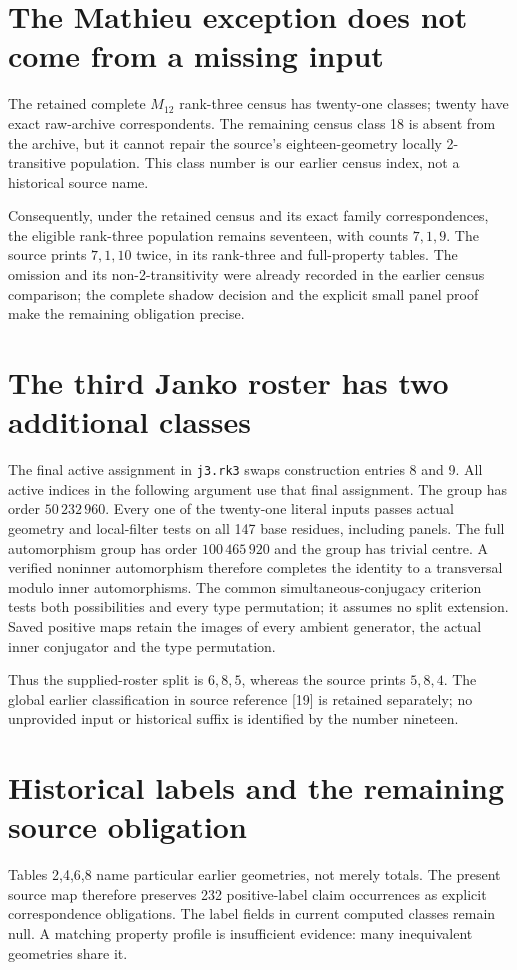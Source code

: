 \documentclass[11pt,a4paper]{article}
\begin{document}
\section{The Mathieu exception does not come from a missing input}
The retained complete $M_{12}$ rank-three census has twenty-one classes;
twenty have exact raw-archive correspondents. The remaining census
class 18 is absent from the archive, but it cannot repair the source's
eighteen-geometry locally 2-transitive population. This class number is
our earlier census index, not a historical source name.

Consequently, under the retained census and its exact family
correspondences, the eligible rank-three population remains seventeen,
with counts $7,1,9$. The source prints $7,1,10$ twice, in its rank-three
and full-property tables. The omission and its non-2-transitivity were
already recorded in the earlier census comparison; the complete shadow
decision and the explicit small panel proof make the remaining
obligation precise.

\section{The third Janko roster has two additional classes}
The final active assignment in \texttt{j3.rk3} swaps construction entries
8 and 9. All active indices in the following argument use that final
assignment. The group has order $50\,232\,960$. Every one of the
twenty-one literal inputs passes actual geometry and local-filter tests
on all 147 base residues, including panels. The full automorphism group
has order $100\,465\,920$ and the group has trivial centre. A verified
noninner automorphism therefore completes the identity to a transversal
modulo inner automorphisms. The common simultaneous-conjugacy criterion
tests both possibilities and every type permutation; it assumes no
split extension. Saved positive maps retain the images of every ambient
generator, the actual inner conjugator and the type permutation.

Thus the supplied-roster split is $6,8,5$, whereas the source prints
$5,8,4$. The global earlier classification in source reference [19]
is retained separately; no unprovided input or historical suffix is
identified by the number nineteen.

\section{Historical labels and the remaining source obligation}
Tables 2,4,6,8 name particular earlier geometries, not merely totals.
The present source map therefore preserves 232 positive-label claim
occurrences as explicit correspondence obligations. The label fields
in current computed classes remain null. A matching property profile
is insufficient evidence: many inequivalent geometries share it.
\end{document}
